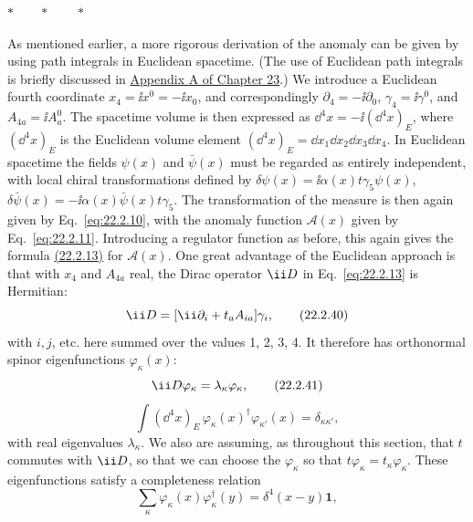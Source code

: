 \begin{center}
 $\ast\qquad\ast\qquad\ast$
\end{center}

As mentioned earlier, a more rigorous derivation of the anomaly can be
given by using path integrals in Euclidean spacetime. (The use of Euclidean
path integrals is briefly discussed in
\hyperref[app:23.A]{Appendix A of Chapter 23}.) We introduce a Euclidean
fourth coordinate $x_4=\ii x^0=-\ii x_0$, and correspondingly
$\partial_4=-\ii\partial_0$, $\gamma_4=\ii\gamma^0$, and
$A_{4a}=\ii A_a^0$. The spacetime volume is then expressed as
$\dd^4x=-\ii(\dd^4x)_E$, where $(\dd^4x)_E$ is the Euclidean volume element
$(\dd^4x)_E=\dd x_1\dd x_2\dd x_3\dd x_4$. In Euclidean spacetime the fields $\psi(x)$
and $\bar\psi(x)$ must be regarded as entirely independent, with local
chiral transformations defined by
$\delta\psi(x)=\ii\alpha(x)t\gamma_5\psi(x)$,
$\delta\bar\psi(x)=-\ii\alpha(x)\bar\psi(x)t\gamma_5$. The transformation of
the measure is then again given by Eq.~\eqref{eq:22.2.10}, with the anomaly
function $\mathcal A(x)$ given by Eq.~\eqref{eq:22.2.11}. Introducing a
regulator function as before, this again gives the formula
\hyperref[eq:22.2.13]{(22.2.13)} for $\mathcal A(x)$. One great advantage
of the Euclidean approach is that with $x_4$ and $A_{4a}$ real, the
Dirac operator $\ii\sl{D}$ in Eq.~\eqref{eq:22.2.13} is Hermitian:
\begin{equation}
 \ii\sl{D}=[\ii\partial_i+t_a A_{ia}]\gamma_i,
 \tag{22.2.40}\label{eq:22.2.40}
\end{equation}
with $i,j$, etc. here summed over the values 1, 2, 3, 4. It therefore has
orthonormal spinor eigenfunctions $\varphi_\kappa(x)$:
\begin{equation}
 \ii\sl{D}\varphi_\kappa=\lambda_\kappa\varphi_\kappa,
 \tag{22.2.41}\label{eq:22.2.41}
\end{equation}
\begin{equation}
 \int(\dd^4x)_E\,\varphi_\kappa(x)^\dagger\varphi_{\kappa'}(x)
 =\delta_{\kappa\kappa'},
 \tag{22.2.42}\label{eq:22.2.42}
\end{equation}
with real eigenvalues $\lambda_\kappa$. We also are assuming, as throughout
this section, that $t$ commutes with $\ii\sl{D}$, so that we can choose the
$\varphi_\kappa$ so that
$t\varphi_\kappa=t_\kappa\varphi_\kappa$. These eigenfunctions satisfy a
completeness relation
\begin{equation}
 \sum_\kappa\varphi_\kappa(x)\varphi_\kappa^\dagger(y)
 =\delta^4(x-y)\mathbf{1},
 \tag{22.2.43}\label{eq:22.2.43}
\end{equation}
